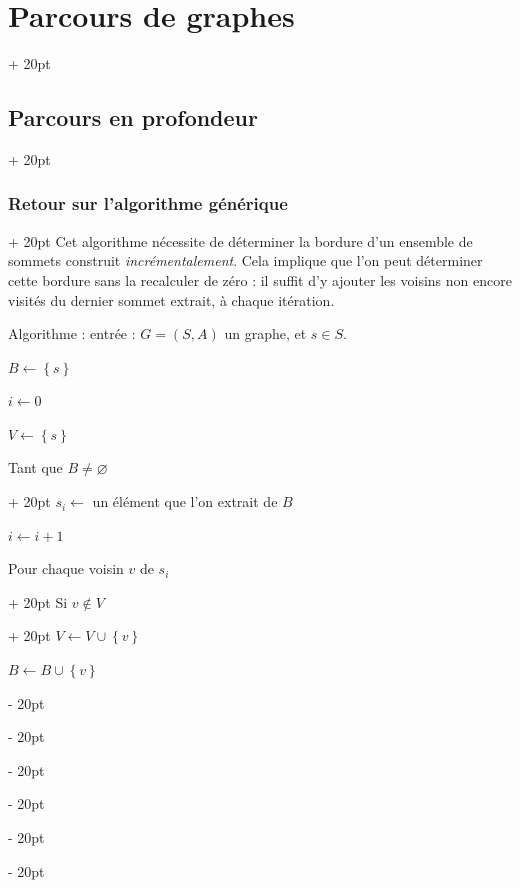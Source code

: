 \documentclass[a4paper, 12pt, twoside]{article}
\newcommand{\set}[1]{\left\{ #1 \right\}}
\newcommand{\ind}[1][20pt]{\advance\leftskip + #1}
\newcommand{\deind}[1][20pt]{\advance\leftskip - #1}
\newenvironment{indt}[2][20pt]{#2 \par \ind[#1]}{\par \deind} %
\begin{document}
\begin{indt}{\section{Parcours de graphes}}
        \begin{indt}{\subsection{Parcours en profondeur}}
            \begin{indt}{\subsubsection{Retour sur l'algorithme générique}}
                Cet algorithme nécessite de déterminer la bordure d'un ensemble de sommets construit \textit{incrémentalement}. Cela implique que l'on peut déterminer cette bordure sans la recalculer de zéro : il suffit d'y ajouter les voisins non encore visités du dernier sommet extrait, à chaque itération.

                \vspace{12pt}
                
                Algorithme : entrée : $G = (S, A)$ un graphe, et $s \in S$.

                \begin{pseudocode}
                    $B \leftarrow \set s$

                    $i \leftarrow 0$

                    $V \leftarrow \set s$

                    \vspace{6pt}
                    
                    \begin{indt}{Tant que $B \neq \varnothing$}
                        $s_i \leftarrow$ un élément que l'on extrait de $B$
                        
                        $i \leftarrow i + 1$

                        \vspace{6pt}
                        
                        \begin{indt}{Pour chaque voisin $v$ de $s_i$}
                            \begin{indt}{Si $v \notin V$}
                                $V \leftarrow V \cup \set v$

                                $B \leftarrow B \cup \set v$
                            \end{indt}
                        \end{indt}
                    \end{indt}


\end{pseudocode}
\end{indt}
\end{indt}
\end{indt}
\end{document}
